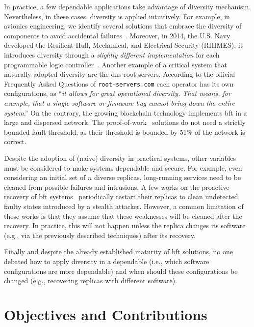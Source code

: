 In practice, a few dependable applications take advantage of diversity mechanism. Nevertheless, in these cases, diversity is applied intuitively.
For example, in avionics engineering, we identify several solutions that embrace the diversity of components to avoid accidental failures~\cite{Yeh:2004}.
Moreover, in 2014, the U.S. Navy developed the Resilient Hull, Mechanical, and Electrical Security (RHIMES), it introduces diversity through a \emph{slightly different implementation} for each programmable logic controller~\cite{rhimes}.
Another example of a critical system that naturally adopted diversity are the \gls{dns} root servers. 
According to the official Frequently Asked Questions of \texttt{root-servers.com} each operator has its own configurations, as ``\emph{it allows for great operational diversity. That means, for example, that a single software or firmware bug cannot bring down the entire system}.''
On the contrary, the growing blockchain technology implements \gls{bft} in a large and dispersed network.
The proof-of-work~\cite{} solutions do not need a strictly bounded fault threshold, as their threshold is bounded by 51\% of the network is correct.


Despite the adoption of (naive) diversity in practical systems, other variables must be considered to make systems dependable and secure.
For example, even considering an initial set of $n$ diverse replicas, long-running services need to be cleaned from possible failures and intrusions.
A few works on the proactive recovery of \gls{bft} systems~\cite{Castro:2002,Sousa:2010,Roeder:2010,Platania:2014,Distler:2011} periodically restart their replicas to clean undetected faulty states introduced by a stealth attacker. 
However, a common limitation of these works is that they assume that these weaknesses will be cleaned after the recovery.
In practice, this will not happen unless the replica changes its software (e.g., via the previously described techniques) after its recovery.


Finally and despite the already established maturity of \gls{bft} solutions, no one debated how to apply diversity in a dependable (i.e., which software configurations are more dependable) and when should these configurations be changed (e.g., recovering replicas with different software).

\section{Objectives and Contributions}

